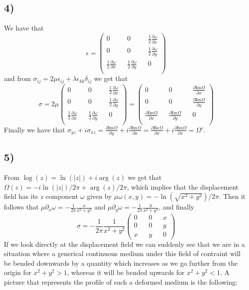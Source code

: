 \documentclass[10pt,a4paper]{book}
\begin{document}
\subsection*{4)}
We have that 
$$\epsilon=\begin{pmatrix}
0 && 0 && \frac{1}{2}\frac{\partial \omega}{\partial x}\\
0 && 0 && \frac{1}{2}\frac{\partial \omega}{\partial y}\\
\frac{1}{2}\frac{\partial \omega}{\partial x} && \frac{1}{2}\frac{\partial \omega}{\partial y} && 0\\
\end{pmatrix}$$
and from $\sigma_{ij}=2\mu\epsilon_{ij}+\lambda\epsilon_{kk}\delta_{ij}$ we get that 
$$
\sigma=2\mu\begin{pmatrix}
 0 && 0 && \frac{1}{2}\frac{\partial \omega}{\partial x}\\
0 && 0 && \frac{1}{2}\frac{\partial \omega}{\partial y}\\
\frac{1}{2}\frac{\partial \omega}{\partial x} && \frac{1}{2}\frac{\partial \omega}{\partial y} && 0\\
\end{pmatrix}=
\begin{pmatrix}
 0 && 0 && \frac{\partial\text{Im}\Omega}{\partial x}\\
0 && 0 && \frac{\partial\text{Im}\Omega}{\partial y}\\
\frac{\partial\text{Im}\Omega}{\partial x} && \frac{\partial\text{Im}\Omega}{\partial y} && 0\\
\end{pmatrix}$$
Finally we have that $\sigma_{yz}+i\sigma_{xz}=\frac{\partial\text{Im}\Omega}{\partial y}+i\frac{\partial\text{Im}\Omega}{\partial x}=\frac{\partial\text{Re}\Omega}{\partial x}+i\frac{\partial\text{Im}\Omega}{\partial x}=\Omega'$.

\subsection*{5)}
From $\log(z)=\ln(|z|)+i\arg(z)$ we get that $\Omega(z)=-i\ln(|z|)/2\pi+\arg(z)/2\pi$, which implies that the displacement field has its $z$ component $\omega$ given by $\mu\omega(x,y)=-\ln(\sqrt{x^2+y^2})/2\pi$. Then it follows that $\mu\partial_x\omega=-\frac{1}{2\pi}\frac{x}{x^2+y^2}$ and $\mu\partial_y\omega=-\frac{1}{2\pi}\frac{y}{x^2+y^2}$, and finally
$$\sigma=-\frac{1}{2\pi}\frac{1}{x^2+y^2}\begin{pmatrix}
0 && 0 && x\\
0 && 0 && y\\
x && y && 0
\end{pmatrix}$$
If we look directly at the displacement field we can suddenly see that we are in a situation where a generical continuous medium under this field of contraint will be bended downwards by a quantity which increases as we go further from the origin for $x^2+y^2>1$, whereas it will be bended upwards for $x^2+y^2<1$. A picture that represents the profile of such a deformed medium is the following:\\
\end{document}
